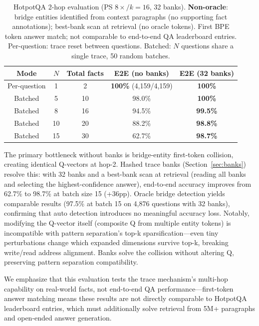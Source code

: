 \documentclass[11pt,a4paper]{article}
\begin{document}
\begin{table}[t]
  \centering
  \caption{HotpotQA 2-hop evaluation (PS $8\times/k{=}16$, 32 banks). \textbf{Non-oracle}: bridge entities identified from context paragraphs (no supporting fact annotations); best-bank scan at retrieval (no oracle tokens). First BPE token answer match; not comparable to end-to-end QA leaderboard entries. Per-question: trace reset between questions. Batched: $N$ questions share a single trace, 50 random batches.}
  \label{tab:hotpotqa}
  \begin{tabular}{@{}ccccc@{}}
    \toprule
    Mode & $N$ & Total facts & E2E (no banks) & E2E (32 banks) \\
    \midrule
    Per-question & 1 & 2 & \textbf{100\%} (4,159/4,159) & \textbf{100\%} \\
    \midrule
    Batched & 5 & 10 & 98.0\% & \textbf{100\%} \\
    Batched & 8 & 16 & 94.5\% & \textbf{99.5\%} \\
    Batched & 10 & 20 & 88.2\% & \textbf{98.8\%} \\
    Batched & 15 & 30 & 62.7\% & \textbf{98.7\%} \\
    \bottomrule
  \end{tabular}
\end{table}

The primary bottleneck without banks is bridge-entity first-token collision, creating identical Q-vectors at hop-2. Hashed trace banks (Section~\ref{sec:banks}) resolve this: with 32 banks and a best-bank scan at retrieval (reading all banks and selecting the highest-confidence answer), end-to-end accuracy improves from 62.7\% to 98.7\% at batch size 15 (+36pp). Oracle bridge detection yields comparable results (97.5\% at batch 15 on 4,876 questions with 32 banks), confirming that auto detection introduces no meaningful accuracy loss. Notably, modifying the Q-vector itself (composite Q from multiple entity tokens) is incompatible with pattern separation's top-k sparsification---even tiny perturbations change which expanded dimensions survive top-k, breaking write/read address alignment. Banks solve the collision without altering Q, preserving pattern separation compatibility.

We emphasize that this evaluation tests the trace mechanism's multi-hop capability on real-world facts, not end-to-end QA performance---first-token answer matching means these results are not directly comparable to HotpotQA leaderboard entries, which must additionally solve retrieval from 5M+ paragraphs and open-ended answer generation.
\end{document}
